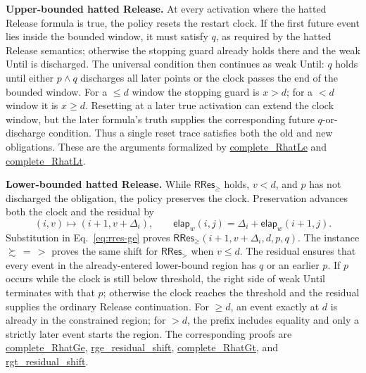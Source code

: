 \documentclass{ieeeaccess}
\newcommand{\elapsed}{\mathsf{elap}}
\newcommand{\runinhead}[1]{\par\noindent\textbf{#1}\enspace}
\newcommand{\Rocqid}[1]{\url{#1}}
\begin{document}
\runinhead{Upper-bounded hatted Release.}
At every activation where the hatted Release formula is true, the policy
resets the restart clock. If the first future event lies inside the bounded window, it must satisfy $q$,
as required by the hatted Release semantics; otherwise the stopping guard
already holds there and the weak Until is discharged. The universal condition then
continues as weak Until: $q$ holds until either $p\land q$ discharges all
later points or the clock passes the end of the bounded window. For a
$\le d$ window the stopping guard is $x>d$; for a $<d$ window it is
$x\ge d$. Resetting at a later true activation can extend the clock window,
but the later formula's truth supplies the corresponding future
$q$-or-discharge condition. Thus a single reset trace satisfies both the old
and new obligations. These are the arguments formalized by
\Rocqid{complete_RhatLe} and \Rocqid{complete_RhatLt}.

\runinhead{Lower-bounded hatted Release.}
While $\mathsf{RRes}_{\ge}$ holds, $v<d$, and $p$ has not discharged the
obligation, the policy preserves the clock. Preservation advances both the
clock and the residual by
\[
(i,v)\longmapsto(i+1,v+\Delta_i),
\qquad
\elapsed_w(i,j)=\Delta_i+\elapsed_w(i+1,j).
\]
Substitution in Eq.~\eqref{eq:rres-ge} proves
$\mathsf{RRes}_{\ge}(i+1,v+\Delta_i,d,p,q)$. The instance $\succsim\,=\,>$
proves the same shift for $\mathsf{RRes}_{>}$ when $v\le d$. The residual ensures that
every event in the already-entered lower-bound region has $q$ or an earlier
$p$. If $p$ occurs while the clock is still below threshold, the right side
of weak Until terminates with that $p$; otherwise the clock reaches the
threshold and the residual supplies the ordinary Release continuation.
For $\ge d$, an event exactly at $d$ is already in the constrained region;
for $>d$, the prefix includes equality and only a strictly later event
starts the region. The corresponding proofs are
\Rocqid{complete_RhatGe}, \Rocqid{rge_residual_shift},
\Rocqid{complete_RhatGt}, and \Rocqid{rgt_residual_shift}.
\end{document}
